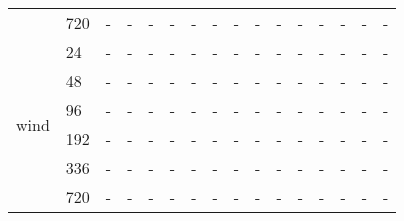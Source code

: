 \begin{tabular}{llllllllllllllll}
 & 720 & - & - & - & - & - & - & - & - & - & - & - & - & - & - \\
\cline{1-16}
\multirow[t]{6}{*}{wind} & 24 & - & - & - & - & - & - & - & - & - & - & - & - & - & - \\
 & 48 & - & - & - & - & - & - & - & - & - & - & - & - & - & - \\
 & 96 & - & - & - & - & - & - & - & - & - & - & - & - & - & - \\
 & 192 & - & - & - & - & - & - & - & - & - & - & - & - & - & - \\
 & 336 & - & - & - & - & - & - & - & - & - & - & - & - & - & - \\
 & 720 & - & - & - & - & - & - & - & - & - & - & - & - & - & - \\
\cline{1-16}
\bottomrule
\end{tabular}
